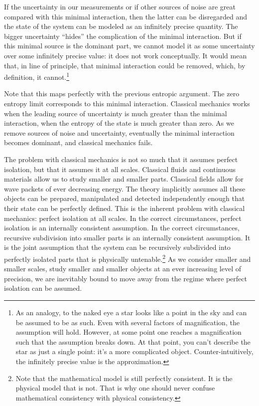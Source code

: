 \documentclass[10pt,twocolumn, nofootinbib]{revtex4-2}
\begin{document}
If the uncertainty in our measurements or if other sources of noise are great compared with this minimal interaction, then the latter can be disregarded and the state of the system can be modeled as an infinitely precise quantity. The bigger uncertainty ``hides'' the complication of the minimal interaction. But if this minimal source is the dominant part, we cannot model it as some uncertainty over some infinitely precise value: it does not work conceptually. It would mean that, in line of principle, that minimal interaction could be removed, which, by definition, it cannot.\footnote{As an analogy, to the naked eye a star looks like a point in the sky and can be assumed to be as such. Even with several factors of magnification, the assumption will hold. However, at some point one reaches a magnification such that the assumption breaks down. At that point, you can't describe the star as just a single point: it's a more complicated object. Counter-intuitively, the infinitely precise value is the approximation.}

Note that this maps perfectly with the previous entropic argument. The zero entropy limit corresponds to this minimal interaction. Classical mechanics works when the leading source of uncertainty is much greater than the minimal interaction, when the entropy of the state is much greater than zero. As we remove sources of noise and uncertainty, eventually the minimal interaction becomes dominant, and classical mechanics fails.

The problem with classical mechanics is not so much that it assumes perfect isolation, but that it assumes it at all scales. Classical fluids and continuous materials allow us to study smaller and smaller parts. Classical fields allow for wave packets of ever decreasing energy. The theory implicitly assumes all these objects can be prepared, manipulated and detected independently enough that their state can be perfectly defined. This is the inherent problem with classical mechanics: perfect isolation at all scales. In the correct circumstances, perfect isolation is an internally consistent assumption. In the correct circumstances, recursive subdivision into smaller parts is an internally consistent assumption. It is the joint assumption that the system can be recursively subdivided into perfectly isolated parts that is physically untenable.\footnote{Note that the mathematical model is still perfectly consistent. It is the physical model that is not. That is why one should never confuse mathematical consistency with physical consistency.} As we consider smaller and smaller scales, study smaller and smaller objects at an ever increasing level of precision, we are inevitably bound to move away from the regime where perfect isolation can be assumed.
\end{document}
